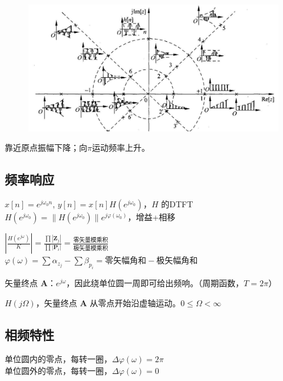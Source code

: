 \vspace{-10pt}
\begin{figure}[H]
    \centering
    \includegraphics[width=\linewidth]{figure/Pasted image 20220612232835.png}
\end{figure}
\vspace{-10pt}
靠近原点振幅下降；向\(\pi\)运动频率上升。

\subsection{频率响应}

\(x[n] = e^{j\omega_0 n}\), \(y[n]=x[n]H(e^{j\omega_0})\)，$H$ 的DTFT
\(H(e^{j\omega_0})=\|H(e^{j\omega_0})\|e^{j\varphi(\omega_0)}\)，增益+相移

\vspace{-5pt}
\begin{description}
\tightlist
\item[几何确定] \(\left|\frac{H(e^{j\omega})}{K}\right| = \frac{\prod|\boldsymbol Z_j|}{\prod|\boldsymbol P_i|} = \frac{\text{零矢量模乘积}}{\text{极矢量模乘积}}\)
\(\varphi(\omega) = \sum \alpha_{z_j} - \sum \beta_{p_i} = \text{零矢幅角和} - \text{极矢幅角和}\)

\item[离散] 矢量终点 $\boldsymbol A$：$e^{j\omega}$，因此绕单位圆一周即可给出频响。（周期函数，$T=2\pi$）

\item[连续] \(H(j\Omega)\)，矢量终点 $\boldsymbol A$ 从零点开始沿虚轴运动。$0\leq \Omega < \infty$

\end{description}

\subsection{相频特性}
单位圆内的零点，每转一圈，$\Delta\varphi(\omega) = 2\pi$\\
单位圆外的零点，每转一圈，$\Delta\varphi(\omega) = 0$

